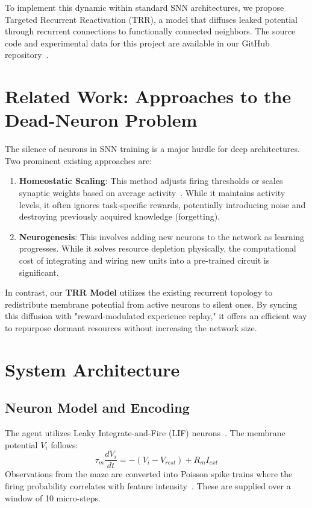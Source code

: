 \documentclass{article}
\begin{document}
To implement this dynamic within standard SNN architectures, we propose Targeted Recurrent Reactivation (TRR), a model that diffuses leaked potential through recurrent connections to functionally connected neighbors. The source code and experimental data for this project are available in our GitHub repository~\cite{fumiaki2026wine}.

\section{Related Work: Approaches to the Dead-Neuron Problem}
The silence of neurons in SNN training is a major hurdle for deep architectures. Two prominent existing approaches are:

\begin{enumerate}
    \item \textbf{Homeostatic Scaling}: This method adjusts firing thresholds or scales synaptic weights based on average activity~\cite{brunel2000dynamics}. While it maintains activity levels, it often ignores task-specific rewards, potentially introducing noise and destroying previously acquired knowledge (forgetting).
    \item \textbf{Neurogenesis}: This involves adding new neurons to the network as learning progresses. While it solves resource depletion physically, the computational cost of integrating and wiring new units into a pre-trained circuit is significant.
\end{enumerate}

In contrast, our \textbf{TRR Model} utilizes the existing recurrent topology to redistribute membrane potential from active neurons to silent ones. By syncing this diffusion with "reward-modulated experience replay," it offers an efficient way to repurpose dormant resources without increasing the network size.

\section{System Architecture}
\subsection{Neuron Model and Encoding}
The agent utilizes Leaky Integrate-and-Fire (LIF) neurons~\cite{abbott1999lapicque}. The membrane potential $V_i$ follows:
\begin{equation}
\tau_m \frac{dV_i}{dt} = -(V_i - V_{rest}) + R_m I_{ext}
\end{equation}
Observations from the maze are converted into Poisson spike trains where the firing probability correlates with feature intensity~\cite{10.1371/journal.pcbi.0030031}. These are supplied over a window of 10 micro-steps.
\end{document}
